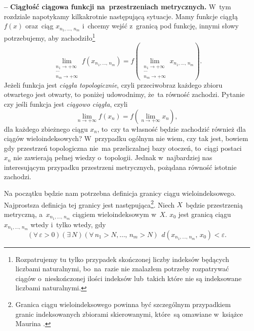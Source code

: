 \documentclass[a4paper,11pt]{article}
\newcommand{\ld}{\ldots}
\newcommand{\ra}{\rightarrow}
\newcommand{\wtw}{wtedy i~tylko wtedy}
\newcommand{\veps}{\varepsilon}
\newcommand{\Lim}{\lim\limits}
\newcommand{\tb}{\textbf}
\newcommand{\noi}{\noindent}
\newcommand{\start}{\noi \tb{--} {}}
\begin{document}
\start \tb{Ciągłość ciągowa funkcji na~przestrzeniach metrycznych.}
W~tym rozdziale napotykamy kilkakrotnie następującą sytuacje. Mamy
funkcje ciągłą $f( x )$ oraz~ciąg $x_{ n_{ 1 }, \ld, \, n_{ m } }$
i~chcemy wejść z~granicą pod funkcję, innymi słowy potrzebujemy, aby
zachodziło\footnote{Rozpatrujemy tu tylko przypadek skończonej liczby
  indeksów będących liczbami naturalnymi, bo~na~razie nie znalazłem
  potrzeby rozpatrywać ciągów o~nieskończonej ilości indeksów
  lub~takich które nie są indeksowane liczbami naturalnymi.}
\begin{equation*}
  \Lim_{ \substack{ n_{ 1 } \ra +\infty \\ \cdots \\  n_{ m } \ra +\infty } }
  f( x_{ n_{ 1 }, \ld, \, n_{ m } } )
  = f( \Lim_{ \substack{ n_{ 1 } \ra +\infty \\ \cdots \\ n_{ m } \ra +\infty } }
  x_{ n_{ 1 }, \ld, \, n_{ m } } ).
\end{equation*}
Jeżeli funkcja jest \emph{ciągła topologicznie}, czyli przeciwobraz
każdego zbioru otwartego jest otwarty, to poniżej udowodnimy, że~ta
równość zachodzi. Pytanie czy jeśli funkcja jest \emph{ciągowo
  ciągła}, czyli
\begin{equation*}
  \Lim_{ n \ra +\infty } f( x_{ n } ) = f( \Lim_{ n \ra +\infty } x_{ n } ),
\end{equation*}
dla każdego zbieżnego ciągu $x_{ n }$, to~czy ta własność będzie
zachodzić również dla ciągów wieloindeksowych? W~przypadku ogólnym nie
wiem, czy tak jest, bowiem gdy przestrzeń topologiczna nie~ma
przeliczalnej bazy otoczeń, to~ciągi postaci $x_{ n }$ nie zawierają
pełnej wiedzy o~topologii. Jednak w~najbardziej nas interesującym
przypadku przestrzeni metrycznych, pożądana równość istotnie zachodzi.

Na początku będzie nam potrzebna definicja granicy ciągu
wieloindeksowego. Najprostsza definicja tej granicy jest
następująca\footnote{Granica ciągu wieloindeksowego powinna być
  szczególnym przypadkiem granic indeksowanych zbiorami skierowanymi,
  które~są omawiane w~książce Maurina \cite{Maurin74}.}. Niech
$X$~będzie przestrzenią metryczną, a~$x_{ n_{ 1 }, \ld, \, n_{ m } }$
ciągiem wieloindeksowym w~$X$. $x_{ 0 }$ jest granicą ciągu
$x_{ n_{ 1 }, \ld, \, n_{ m } }$ \wtw, gdy
\begin{equation*}
  ( \forall \, \veps > 0) ( \exists \, N )
  ( \forall \, n_{ 1 } > N, \ld, \, n_{ m } > N ) \;\,
  d( x_{ n_{ 1 }, \ld, \, n_{ m } }, \, x_{ 0 } ) < \veps.
\end{equation*}
\end{document}
